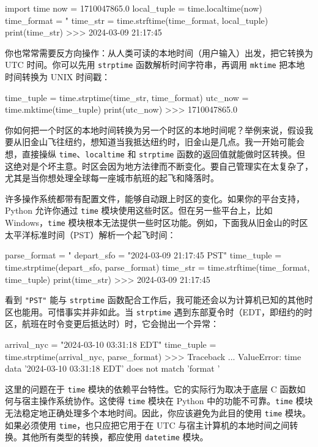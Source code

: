 \begin{codebox}[python]
import time
now = 1710047865.0
local_tuple = time.localtime(now)
time_format = "%
time_str = time.strftime(time_format, local_tuple)
print(time_str)
>>>
2024-03-09 21:17:45
\end{codebox}

你也常常需要反方向操作：从人类可读的本地时间（用户输入）出发，把它转换为 UTC 时间。你可以先用 \texttt{strptime} 函数解析时间字符串，再调用 \texttt{mktime} 把本地时间转换为 UNIX 时间戳：

\begin{codebox}[python]
time_tuple = time.strptime(time_str, time_format)
utc_now = time.mktime(time_tuple)
print(utc_now)
>>>
1710047865.0
\end{codebox}

你如何把一个时区的本地时间转换为另一个时区的本地时间呢？举例来说，假设我要从旧金山飞往纽约，想知道当我抵达纽约时，旧金山是几点。我一开始可能会想，直接操纵 \texttt{time}、\texttt{localtime} 和 \texttt{strptime} 函数的返回值就能做时区转换。但这绝对是个坏主意。时区会因为地方法律而不断变化。要自己管理实在太复杂了，尤其是当你想处理全球每一座城市航班的起飞和降落时。

许多操作系统都带有配置文件，能够自动跟上时区的变化。如果你的平台支持，Python 允许你通过 \texttt{time} 模块使用这些时区。但在另一些平台上，比如 Windows，\texttt{time} 模块根本无法提供一些时区功能。例如，下面我从旧金山的时区太平洋标准时间（PST）解析一个起飞时间：

\begin{codebox}[python]
parse_format = "%
depart_sfo = "2024-03-09 21:17:45 PST"
time_tuple = time.strptime(depart_sfo, parse_format)
time_str = time.strftime(time_format, time_tuple)
print(time_str)
>>>
2024-03-09 21:17:45
\end{codebox}

看到 \texttt{"PST"} 能与 \texttt{strptime} 函数配合工作后，我可能还会以为计算机已知的其他时区也能用。可惜事实并非如此。当 \texttt{strptime} 遇到东部夏令时（EDT，即纽约的时区，航班在时令变更后抵达时）时，它会抛出一个异常：

\begin{codebox}[python]
arrival_nyc = "2024-03-10 03:31:18 EDT"
time_tuple = time.strptime(arrival_nyc, parse_format)
>>>
Traceback ...
ValueError: time data '2024-03-10 03:31:18 EDT' does not match
'format '%
\end{codebox}

这里的问题在于 \texttt{time} 模块的依赖平台特性。它的实际行为取决于底层 C 函数如何与宿主操作系统协作。这使得 \texttt{time} 模块在 Python 中的功能不可靠。\texttt{time} 模块无法稳定地正确处理多个本地时间。因此，你应该避免为此目的使用 \texttt{time} 模块。如果必须使用 \texttt{time}，也只应把它用于在 UTC 与宿主计算机的本地时间之间转换。其他所有类型的转换，都应使用 \texttt{datetime} 模块。

